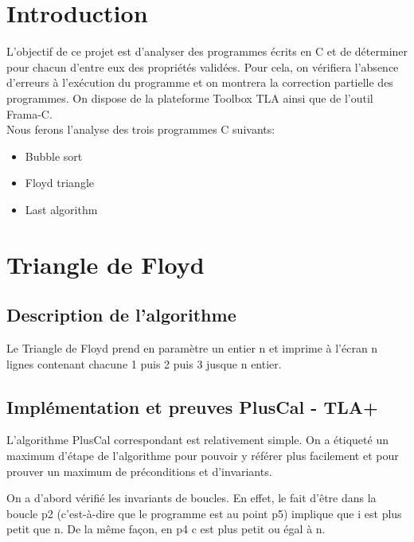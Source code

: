 \documentclass[a4paper,11pt, oneside]{book}
\author{Romain Cahu, Victor Cholley-Barroyer, Yann Prono, Quentin Tardivon}
\date{\today}
\begin{document}
	\begin{titlepage}
		
	\end{titlepage}

	\newpage\newpage\null\thispagestyle{empty}
	\newpage
		\tableofcontents
		\thispagestyle{empty}

	\chapter{Introduction}
	\setcounter{page}{1}

		L'objectif de ce projet est d'analyser des programmes écrits en C et de déterminer pour chacun d'entre eux des
		propriétés validées. Pour cela, on vérifiera l'absence d'erreurs à l'exécution du programme et on montrera la correction partielle des programmes.
		On dispose de la plateforme Toolbox TLA ainsi que de l'outil Frama-C.\\

		\noindent Nous ferons l'analyse des trois programmes C suivants:
		\begin{itemize}
			\item Bubble sort
			\item Floyd triangle
			\item Last algorithm
		\end{itemize}

	\chapter{Triangle de Floyd}

		\section{Description de l'algorithme}

		Le Triangle de Floyd prend en paramètre un entier n et imprime à l'écran
		n lignes contenant chacune 1 puis 2 puis 3 jusque n entier.


		\section{Implémentation et preuves PlusCal - TLA+}

			L'algorithme PlusCal correspondant est relativement simple. On a étiqueté
			un maximum d'étape de l'algorithme pour pouvoir y référer plus facilement
			et pour prouver un maximum de préconditions et d'invariants.

			On a d'abord vérifié les invariants de boucles. En effet, le fait d'être
			dans la boucle p2 (c'est-à-dire que le programme est au point p5) implique
			que i est plus petit que n. De la même façon, en p4 c est plus petit ou égal
			à n.
\end{document}
